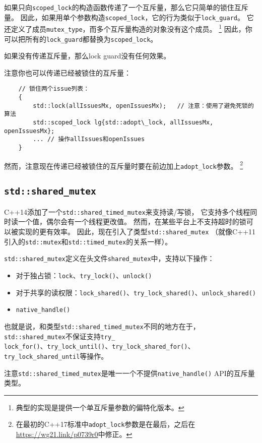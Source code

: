 如果只向\texttt{scoped\_lock}的构造函数传递了一个互斥量，那么它只简单的锁住互斥量。
因此，如果用单个参数构造\texttt{scoped\_lock}，它的行为类似于\texttt{lock\_guard}。
它还定义了成员\texttt{mutex\_type}，而多个互斥量构造的对象没有这个成员。
\footnote{典型的实现是提供一个单互斥量参数的偏特化版本。}
因此，你可以把所有的\texttt{lock\_guard}都替换为\texttt{scoped\_lock}。

如果没有传递互斥量，那么lock guard没有任何效果。

注意你也可以传递已经被锁住的互斥量：
\begin{lstlisting}
    // 锁住两个issue列表：
    {
        std::lock(allIssuesMx, openIssuesMx);   // 注意：使用了避免死锁的算法
        std::scoped_lock lg{std::adopt\_lock, allIssuesMx, openIssuesMx};
        ... // 操作allIssues和openIssues
    }
\end{lstlisting}
然而，注意现在传递已经被锁住的互斥量时要在前边加上\texttt{adopt\_lock}参数。
\footnote{在最初的C++17标准中\texttt{adopt\_lock}参数是在最后，之后在
\url{https://wg21.link/p0739r0}中修正。}

\subsection{\texttt{std::shared\_mutex}}
C++14添加了一个\texttt{std::shared\_timed\_mutex}来支持读/写锁，
它支持多个线程同时读一个值，偶尔会有一个线程更改值。
然而，在某些平台上不支持超时的锁可以被实现的更有效率。
因此，现在引入了类型\texttt{std::shared\_mutex}
（就像C++11引入的\texttt{std::mutex}和\texttt{std::timed\_mutex}的关系一样）。

\texttt{std::shared\_mutex}定义在头文件\texttt{shared\_mutex}中，支持以下操作：
\begin{itemize}
    \item 对于独占锁：\texttt{lock}、\texttt{try\_lock()}、\texttt{unlock()}
    \item 对于共享的读权限：\texttt{lock\_shared()}、\texttt{try\_lock\_shared()}、\texttt{unlock\_shared()}
    \item \texttt{native\_handle()}
\end{itemize}
也就是说，和类型\texttt{std::shared\_timed\_mutex}不同的地方在于，
\texttt{std::shared\_mutex}不保证支持\texttt{try\_\\
lock\_for()}、\texttt{try\_lock\_until()}、\texttt{try\_lock\_shared\_for()}、\texttt{try\_lock\_shared\_until}等操作。

注意\texttt{std::shared\_timed\_mutex}是唯一一个不提供\texttt{native\_handle()} API的互斥量类型。


